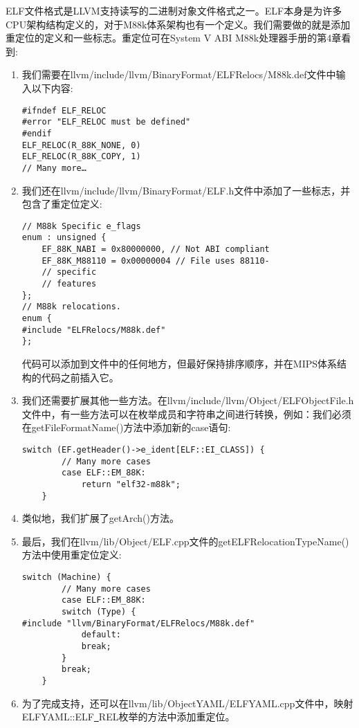 ELF文件格式是LLVM支持读写的二进制对象文件格式之一。ELF本身是为许多CPU架构结构定义的，对于M88k体系架构也有一个定义。我们需要做的就是添加重定位的定义和一些标志。重定位可在System V ABI M88k处理器手册的第4章看到:\par

\begin{enumerate}
\item 我们需要在llvm/include/llvm/BinaryFormat/ELFRelocs/M88k.def文件中输入以下内容:
\begin{lstlisting}[caption={}]
#ifndef ELF_RELOC
#error "ELF_RELOC must be defined"
#endif
ELF_RELOC(R_88K_NONE, 0)
ELF_RELOC(R_88K_COPY, 1)
// Many more…
\end{lstlisting}

\item 我们还在llvm/include/llvm/BinaryFormat/ELF.h文件中添加了一些标志，并包含了重定位定义:
\begin{lstlisting}[caption={}]
// M88k Specific e_flags
enum : unsigned {
	EF_88K_NABI = 0x80000000, // Not ABI compliant
	EF_88K_M88110 = 0x00000004 // File uses 88110-
	// specific
	// features
};
// M88k relocations.
enum {
#include "ELFRelocs/M88k.def"
};
\end{lstlisting}
代码可以添加到文件中的任何地方，但最好保持排序顺序，并在MIPS体系结构的代码之前插入它。

\item 我们还需要扩展其他一些方法。在llvm/include/llvm/Object/ELFObjectFile.h文件中，有一些方法可以在枚举成员和字符串之间进行转换，例如：我们必须在getFileFormatName()方法中添加新的case语句:
\begin{lstlisting}[caption={}]
	switch (EF.getHeader()->e_ident[ELF::EI_CLASS]) {
		// Many more cases
		case ELF::EM_88K:
			return "elf32-m88k";
	}
\end{lstlisting}

\item 类似地，我们扩展了getArch()方法。

\item 最后，我们在llvm/lib/Object/ELF.cpp文件的getELFRelocationTypeName()方法中使用重定位定义:
\begin{lstlisting}[caption={}]
	switch (Machine) {
		// Many more cases
		case ELF::EM_88K:
		switch (Type) {
#include "llvm/BinaryFormat/ELFRelocs/M88k.def"
			default:
			break;
		}
		break;
	}
\end{lstlisting}

\item 为了完成支持，还可以在llvm/lib/ObjectYAML/ELFYAML.cpp文件中，映射ELFYAML::\allowbreak ELF\underline{~}REL枚举的方法中添加重定位。


\end{enumerate}

